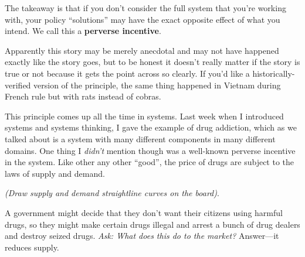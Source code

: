 \documentclass[11pt]{article}
\begin{document}
The takeaway is that if you don't consider the full system that you're working with, your policy ``solutions'' may have the exact opposite effect of what you intend. We call this a {\bf perverse incentive}.

Apparently this story may be merely anecdotal and may not have happened exactly like the story goes, but to be honest it doesn't really matter if the story is true or not because it gets the point across so clearly. If you'd like a historically-verified version of the principle, the same thing happened in Vietnam during French rule but with rats instead of cobras.

This principle comes up all the time in systems. Last week when I introduced systems and systems thinking, I gave the example of drug addiction, which as we talked about is a system with many different components in many different domains. One thing I {\it didn't} mention though was a well-known perverse incentive in the system. Like other any other ``good'', the price of drugs are subject to the laws of supply and demand. %

{\it (Draw supply and demand straightline curves on the board)}. 

A government might decide that they don't want their citizens using harmful drugs, so they might make certain drugs illegal and arrest a bunch of drug dealers and destroy seized drugs. {\it Ask: What does this do to the market?} Answer---it reduces supply.
\end{document}
